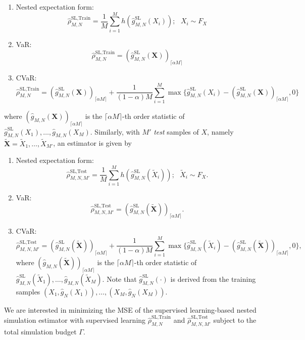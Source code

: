 \documentclass{article}
\begin{document}
\begin{enumerate}
    \item   Nested expectation form:
            $$\hat{\rho}^{\text{SL}, \text{Train}}_{M, N} = \frac{1}{M} \sum_{i=1}^M h(\hat{g}^{\text{SL}}_{M, N}(X_i)); ~~~ X_i \sim F_X$$
    \item   VaR:
            $$\hat{\rho}^{\text{SL}, \text{Train}}_{M, N} = (\hat{g}^{\text{SL}}_{M, N}(\mathbf{X}))_{\lceil \alpha M \rceil}$$
    \item   CVaR:
            $$\hat{\rho}^{\text{SL}, \text{Train}}_{M, N} = (\hat{g}^{\text{SL}}_{M, N}(\mathbf{X}))_{\lceil \alpha M \rceil} + \frac{1}{(1-\alpha) M} \sum_{i=1}^M \max \{\hat{g}^{\text{SL}}_{M, N}(X_i) - (\hat{g}^{\text{SL}}_{M, N}(\mathbf{X}))_{\lceil \alpha M \rceil}, 0 \}$$
\end{enumerate}
where $(\hat{g}_{M, N}(\mathbf{X}))_{\lceil \alpha M \rceil}$ is the $\lceil \alpha M \rceil$-th order statistic of $\hat{g}^{\text{SL}}_{M, N}(X_1), \dots, \hat{g}_{M, N}(X_M)$.
Similarly, with $M'$ \textit{test} samples of $X$, namely $\tilde{\mathbf{X}} = \tilde{X}_1, \dots, \tilde{X}_{M'}$, an estimator is given by

\begin{enumerate}
    \item   Nested expectation form:
            $$\hat{\rho}^{\text{SL}, \text{Test}}_{M, N, M'} = \frac{1}{M} \sum_{i=1}^M h(\hat{g}^{\text{SL}}_{M, N}(\tilde{X}_i)); ~~~ \tilde{X}_i \sim F_X.$$
    \item   VaR:
            $$\hat{\rho}^{\text{SL}, \text{Test}}_{M, N, M'} = (\hat{g}^{\text{SL}}_{M, N}(\tilde{\mathbf{X}}))_{\lceil \alpha M \rceil}.$$
    \item   CVaR:
            $$\hat{\rho}^{\text{SL}, \text{Test}}_{M, N, M'} = (\hat{g}^{\text{SL}}_{M, N}(\tilde{\mathbf{X}}))_{\lceil \alpha M \rceil} + \frac{1}{(1-\alpha) M} \sum_{i=1}^M \max \{\hat{g}^{\text{SL}}_{M, N}(\tilde{X}_i) - (\hat{g}^{\text{SL}}_{M, N}(\tilde{\mathbf{X}}))_{\lceil \alpha M \rceil}, 0 \}, $$
            where $(\hat{g}_{M, N}(\tilde{\mathbf{X}}))_{\lceil \alpha M \rceil}$ is the $\lceil \alpha M \rceil$-th order statistic of $\hat{g}^{\text{SL}}_{M, N}(\tilde{X}_1), \dots, \hat{g}_{M, N}(\tilde{X}_M)$. 
            Note that $\hat{g}^{\text{SL}}_{M, N}(\cdot)$ is derived from the training samples $(X_1, \hat{g}_N(X_1)), \dots, (X_M, \hat{g}_N(X_M))$.
\end{enumerate}
We are interested in minimizing the MSE of the supervised learning-based nested simulation estimator with supervised learning $\hat{\rho}^{\text{SL}, \text{Train}}_{M, N}$ and $\hat{\rho}^{\text{SL}, \text{Test}}_{M, N, M'}$ subject to the total simulation budget $\Gamma$.
\end{document}

